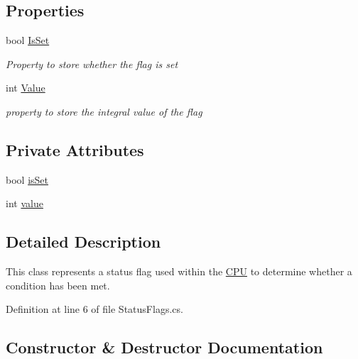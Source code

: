 \subsection*{Properties}
\begin{DoxyCompactItemize}
\item 
bool \hyperlink{class_c_p_u___o_s___simulator_1_1_c_p_u_1_1_status_flags_a96ee01f7bcf0a1d0810c75705e462b43}{Is\+Set}
\begin{DoxyCompactList}\small\item\em Property to store whether the flag is set \end{DoxyCompactList}\item 
int \hyperlink{class_c_p_u___o_s___simulator_1_1_c_p_u_1_1_status_flags_a2978a3bc6493134bb9546c879e625fc2}{Value}
\begin{DoxyCompactList}\small\item\em property to store the integral value of the flag \end{DoxyCompactList}\end{DoxyCompactItemize}
\subsection*{Private Attributes}
\begin{DoxyCompactItemize}
\item 
bool \hyperlink{class_c_p_u___o_s___simulator_1_1_c_p_u_1_1_status_flags_a09019f0ab60c6be65f427e84bc488d6b}{is\+Set}
\item 
int \hyperlink{class_c_p_u___o_s___simulator_1_1_c_p_u_1_1_status_flags_a289edb09fa9bef509188db5619be8dee}{value}
\end{DoxyCompactItemize}


\subsection{Detailed Description}
This class represents a status flag used within the \hyperlink{namespace_c_p_u___o_s___simulator_1_1_c_p_u}{C\+P\+U} to determine whether a condition has been met. 



Definition at line 6 of file Status\+Flags.\+cs.



\subsection{Constructor \& Destructor Documentation}
\hypertarget{class_c_p_u___o_s___simulator_1_1_c_p_u_1_1_status_flags_ab99e9cd2522d43a7dfd3224ff9ae0d79}{}
